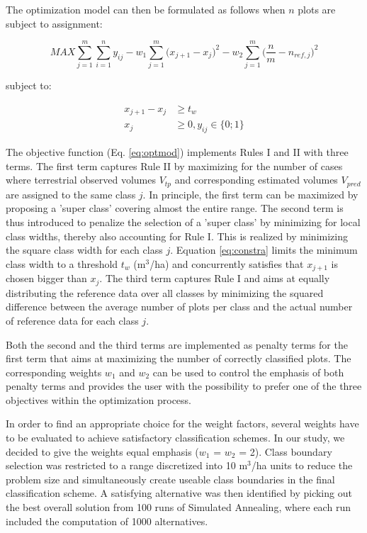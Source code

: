 The optimization model can then be formulated as follows when $n$ plots are subject to assignment:

\begin{equation}\label{eq:optmod}
MAX \sum_{j=1}^{m} \sum_{i=1}^{n} y_{ij} - w_1 \sum_{j=1}^{m}\big(x_{j+1}-x_j\big)^2 - w_2 \sum_{j=1}^{m} \big(\frac{n}{m} - n_{ref,j}\big)^2
\end{equation}

subject to:

\begin{subequations}\label{eq:constr}
	\begin{align}
	x_{j+1}-x_j & \geq t_w \label{eq:constra} \\
	x_j & \geq 0, y_{ij} \in \{0;1\} \label{eq:constrb}
	\end{align}
\end{subequations}

The objective function (Eq. \ref{eq:optmod}) implements Rules I and II with three terms. The first term captures Rule II by maximizing for the number of cases where terrestrial observed volumes $V_{tp}$  and corresponding estimated volumes $V_{pred}$ are assigned to the same class $j$. In principle, the first term can be maximized by proposing a 'super class' covering almost the entire range. The second term is thus introduced to penalize the selection of a 'super class' by minimizing for local class widths, thereby also accounting for Rule I. This is realized by minimizing the square class width for each class $j$. Equation \ref{eq:constra} limits the minimum class width to a threshold $t_w$ (m$^3$/ha) and concurrently satisfies that $x_{j+1}$ is chosen bigger than $x_j$. The third term captures Rule I and aims at equally distributing the reference data over all classes by minimizing the squared difference between the average number of plots per class and the actual number of reference data for each class $j$.\par
Both the second and the third terms are implemented as penalty terms for the first term that aims at maximizing the number of correctly classified plots. The corresponding weights $w_1$ and $w_2$ can be used to control the emphasis of both penalty terms and provides the user with the possibility to prefer one of the three objectives within the optimization process.\par
In order to find an appropriate choice for the weight factors, several weights have to be evaluated to achieve satisfactory classification schemes. In our study, we decided to give the weights equal emphasis ($w_1$ = $w_2$ = 2). Class boundary selection was restricted to a range discretized into 10 m$^3$/ha units to reduce the problem size and simultaneously create useable class boundaries in the final classification scheme. A satisfying alternative was then identified by picking out the best overall solution from 100 runs of Simulated Annealing, where each run included the computation of 1000 alternatives.

